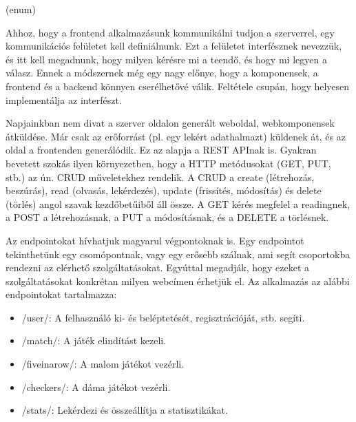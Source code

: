 


(enum)




Ahhoz, hogy a frontend alkalmazásunk kommunikálni tudjon a szerverrel, egy kommunikációs felületet kell definiálnunk. Ezt a felületet interfésznek nevezzük, és itt kell megadnunk, hogy milyen kérésre mi a teendő, és hogy mi legyen a válasz. Ennek a módszernek még egy nagy előnye, hogy a komponensek, a frontend és a backend könnyen cserélhetővé válik. Feltétele csupán, hogy helyesen implementálja az interfészt.

Napjainkban nem divat a szerver oldalon generált weboldal, webkomponensek átküldése. Már csak az erőforrást (pl. egy lekért adathalmazt) küldenek át, és az oldal a frontenden generálódik. Ez az alapja a REST APInak is. Gyakran bevetett szokás ilyen környezetben, hogy a HTTP metódusokat (GET, PUT, stb.) az ún. CRUD műveletekhez rendelik. A CRUD a create (létrehozás, beszúrás), read (olvasás, lekérdezés), update (frissítés, módosítás) és delete (törlés) angol szavak kezdőbetűiből áll össze. A GET kérés megfelel a readingnek, a POST a létrehozásnak, a PUT a módosításnak, és a DELETE a törlésnek.

Az endpointokat hívhatjuk magyarul végpontoknak is. Egy endpointot tekinthetünk egy csomópontnak, vagy egy erősebb szálnak, ami segít csoportokba rendezni az elérhető szolgáltatásokat. Egyúttal megadják, hogy ezeket a szolgáltatásokat konkrétan milyen webcímen érhetjük el. Az alkalmazás az alábbi endpointokat tartalmazza:
\begin{itemize}
	\item /user/: A felhasználó ki- és beléptetését, regisztrációját, stb. segíti.
	\item /match/: A játék elindítást kezeli.
	\item /fiveinarow/: A malom játékot vezérli.
	\item /checkers/: A dáma játékot vezérli.
	\item /stats/: Lekérdezi és összeállítja a statisztikákat.
\end{itemize}

